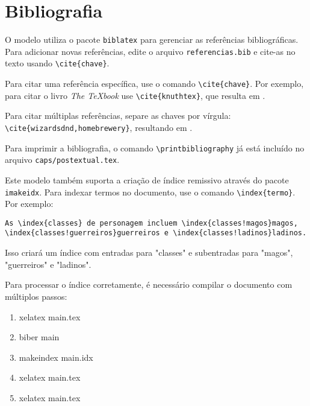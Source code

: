\section{Bibliografia}

O modelo utiliza o pacote \texttt{biblatex} para gerenciar as referências bibliográficas. Para adicionar novas referências, edite o arquivo \texttt{referencias.bib} e cite-as no texto usando \verb|\cite{chave}|.

\begin{highlight}
Para citar uma referência específica, use o comando \verb|\cite{chave}|. Por exemplo, para citar o livro \textit{The TeXbook} use \verb|\cite{knuthtex}|, que resulta em \cite{knuthtex}.

Para citar múltiplas referências, separe as chaves por vírgula: \verb|\cite{wizardsdnd,homebrewery}|, resultando em \cite{wizardsdnd,homebrewery}.
\end{highlight}

Para imprimir a bibliografia, o comando \verb|\printbibliography| já está incluído no arquivo \texttt{caps/postextual.tex}.


Este modelo também suporta a criação de índice remissivo através do pacote \texttt{imakeidx}. Para indexar termos no documento, use o comando \verb|\index{termo}|. Por exemplo:

\begin{quotebox}
\verb|As \index{classes} de personagem incluem \index{classes!magos}magos, \index{classes!guerreiros}guerreiros e \index{classes!ladinos}ladinos.|

Isso criará um índice com entradas para "classes" e subentradas para "magos", "guerreiros" e "ladinos".
\end{quotebox}


Para processar o índice corretamente, é necessário compilar o documento com múltiplos passos:
\begin{enumerate}
    \item xelatex main.tex
    \item biber main
    \item makeindex main.idx
    \item xelatex main.tex
    \item xelatex main.tex
\end{enumerate}

